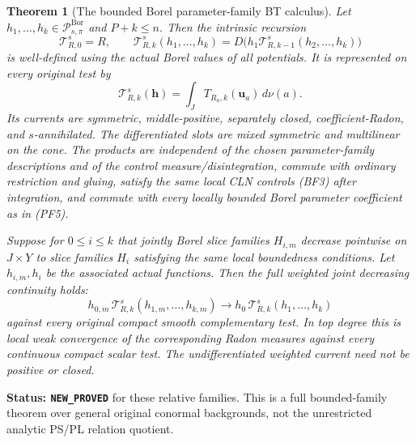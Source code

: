 \documentclass[11pt,a4paper]{article}
\numberwithin{equation}{section}
\newtheorem{theorem}{Theorem}[section]
\theoremstyle{definition}
\theoremstyle{remark}
\begin{document}
\begin{theorem}[The bounded Borel parameter-family BT calculus]
\label{thm:r12-bounded-Borel-family-BT}
Let $h_1,\ldots,h_k\in\mathcal P^{\mathrm{Bor}}_{s,\pi}$ and
$P+k\le n$. Then the intrinsic recursion
\[
 \mathcal T^s_{R,0}=R,\qquad
 \mathcal T^s_{R,k}(h_1,\ldots,h_k)
          =D\bigl(h_1\mathcal T^s_{R,k-1}(h_2,\ldots,h_k)\bigr)
 \tag{BF4}
\]
is well-defined using the actual Borel values of all potentials.
It is represented on every original test by
\[
               \mathcal T^s_{R,k}(\mathbf h)
                      =\int_J T_{R_a,k}(\mathbf u_a)\,d\nu(a).
 \tag{BF5}
\]
Its currents are symmetric, middle-positive, separately closed,
coefficient-Radon, and $s$-annihilated. The differentiated slots
are mixed symmetric and multilinear on the cone. The products are
independent of the chosen parameter-family descriptions and of the
control measure/disintegration, commute with ordinary restriction
and gluing, satisfy the same local CLN controls (BF3) after
integration, and commute with every locally bounded Borel parameter
coefficient as in (PF5).

Suppose for $0\le i\le k$ that jointly Borel slice families
$H_{i,m}$ decrease pointwise on $J\times Y$ to slice families
$H_i$ satisfying the same local boundedness conditions. Let
$h_{i,m},h_i$ be the associated actual functions. Then the full
weighted joint decreasing continuity holds:
\[
 h_{0,m}\,\mathcal T^s_{R,k}(h_{1,m},\ldots,h_{k,m})
          \longrightarrow
 h_0\,\mathcal T^s_{R,k}(h_1,\ldots,h_k)
 \tag{BF6}
\]
against every original compact smooth complementary test. In top
degree this is local weak convergence of the corresponding Radon
measures against every continuous compact scalar test. The
undifferentiated weighted current need not be positive or closed.
\end{theorem}

\noindent\textbf{Status: \texttt{NEW\_PROVED}} for these relative
families. This is a full bounded-family theorem over general
original conormal backgrounds, not the unrestricted analytic
PS/PL relation quotient.
\end{document}
